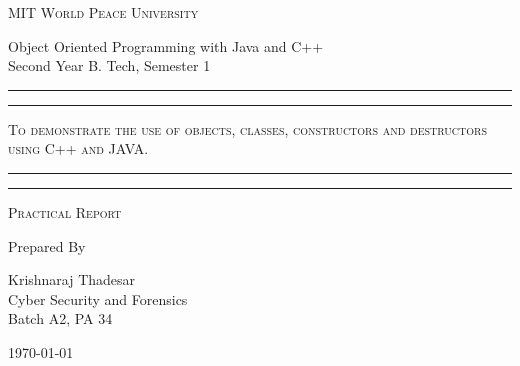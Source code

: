 \documentclass[11pt]{article}
\begin{document}
	
	\begin{titlepage} 
		\centering 
		
		
		\huge\textsc{
			MIT World Peace University
		}\\
	
		\vspace{0.75\baselineskip} %
		
		\LARGE{
			Object Oriented Programming with Java and C++\\
			Second Year B. Tech, Semester 1
		}
		
		\vfill %
		
		
		\rule{\textwidth}{1.6pt}\vspace*{-\baselineskip}\vspace*{2pt}
		\rule{\textwidth}{0.6pt}
		\vspace{0.75\baselineskip} %
		
		
		
		\huge{\textsc{
			To demonstrate the use of objects, classes, constructors and destructors using C++ and JAVA.
			}} \\
		
		
		
		\vspace{0.5\baselineskip} %
		\rule{\textwidth}{0.6pt}\vspace*{-\baselineskip}\vspace*{2.8pt}
		\rule{\textwidth}{1.6pt}
		
		\vspace{1\baselineskip} %

			
		\LARGE\textsc{
			Practical Report
		} %
		\vfill
		
		
		Prepared By
		\vspace{0.5\baselineskip} %
		
		\Large{
			Krishnaraj Thadesar \\
			Cyber Security and Forensics\\
			Batch A2, PA 34
		}
		
		
		\vspace{0.5\baselineskip} %
		\today

	\end{titlepage}
	
\end{document}

